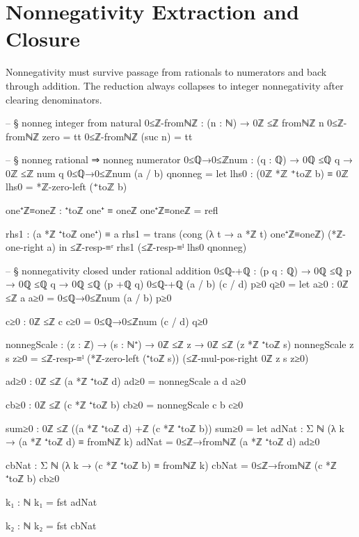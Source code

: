 \documentclass[11pt,a4paper]{book}
\begin{document}
\section{Nonnegativity Extraction and Closure}

Nonnegativity must survive passage from rationals to
numerators and back through addition. The reduction always collapses to
integer nonnegativity after clearing denominators.

\begin{code}
-- § nonneg integer from natural
0≤ℤ-fromℕℤ : (n : ℕ) → 0ℤ ≤ℤ fromℕℤ n
0≤ℤ-fromℕℤ zero = tt
0≤ℤ-fromℕℤ (suc n) = tt

-- § nonneg rational ⇒ nonneg numerator
0≤ℚ→0≤ℤnum : (q : ℚ) → 0ℚ ≤ℚ q → 0ℤ ≤ℤ num q
0≤ℚ→0≤ℤnum (a / b) qnonneg =
  let
    lhs0 : (0ℤ *ℤ ⁺toℤ b) ≡ 0ℤ
    lhs0 = *ℤ-zero-left (⁺toℤ b)

    one⁺ℤ≡oneℤ : ⁺toℤ one⁺ ≡ oneℤ
    one⁺ℤ≡oneℤ = refl

    rhs1 : (a *ℤ ⁺toℤ one⁺) ≡ a
    rhs1 = trans (cong (λ t → a *ℤ t) one⁺ℤ≡oneℤ) (*ℤ-one-right a)
  in
  ≤ℤ-resp-≡ʳ rhs1 (≤ℤ-resp-≡ˡ lhs0 qnonneg)

-- § nonnegativity closed under rational addition
0≤ℚ-+ℚ : (p q : ℚ) → 0ℚ ≤ℚ p → 0ℚ ≤ℚ q → 0ℚ ≤ℚ (p +ℚ q)
0≤ℚ-+ℚ (a / b) (c / d) p≥0 q≥0 =
  let
    a≥0 : 0ℤ ≤ℤ a
    a≥0 = 0≤ℚ→0≤ℤnum (a / b) p≥0

    c≥0 : 0ℤ ≤ℤ c
    c≥0 = 0≤ℚ→0≤ℤnum (c / d) q≥0

    nonnegScale : (z : ℤ) → (s : ℕ⁺) → 0ℤ ≤ℤ z → 0ℤ ≤ℤ (z *ℤ ⁺toℤ s)
    nonnegScale z s z≥0 =
      ≤ℤ-resp-≡ˡ (*ℤ-zero-left (⁺toℤ s))
        (≤ℤ-mul-pos-right 0ℤ z s z≥0)

    ad≥0 : 0ℤ ≤ℤ (a *ℤ ⁺toℤ d)
    ad≥0 = nonnegScale a d a≥0

    cb≥0 : 0ℤ ≤ℤ (c *ℤ ⁺toℤ b)
    cb≥0 = nonnegScale c b c≥0

    sum≥0 : 0ℤ ≤ℤ ((a *ℤ ⁺toℤ d) +ℤ (c *ℤ ⁺toℤ b))
    sum≥0 =
      let
        adNat : Σ ℕ (λ k → (a *ℤ ⁺toℤ d) ≡ fromℕℤ k)
        adNat = 0≤ℤ→fromℕℤ (a *ℤ ⁺toℤ d) ad≥0

        cbNat : Σ ℕ (λ k → (c *ℤ ⁺toℤ b) ≡ fromℕℤ k)
        cbNat = 0≤ℤ→fromℕℤ (c *ℤ ⁺toℤ b) cb≥0

        k₁ : ℕ
        k₁ = fst adNat

        k₂ : ℕ
        k₂ = fst cbNat


\end{code}
\end{document}
